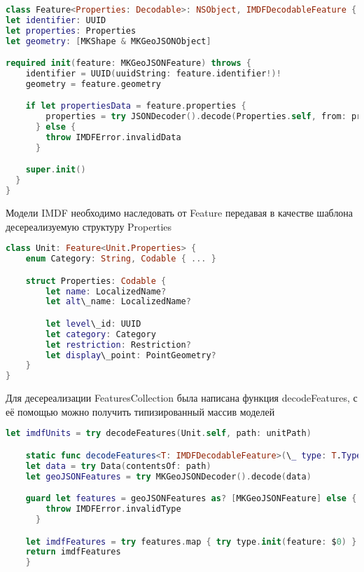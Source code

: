     \begin{lstlisting}[language=swift,caption={Реализация класса Feature}]
class Feature<Properties: Decodable>: NSObject, IMDFDecodableFeature {
let identifier: UUID
let properties: Properties
let geometry: [MKShape & MKGeoJSONObject]

required init(feature: MKGeoJSONFeature) throws {
    identifier = UUID(uuidString: feature.identifier!)!
    geometry = feature.geometry

    if let propertiesData = feature.properties {
        properties = try JSONDecoder().decode(Properties.self, from: propertiesData)
      } else {
        throw IMDFError.invalidData
      }

    super.init()
  }
}
  \end{lstlisting}

    Модели IMDF необходимо наследовать от Feature передавая в качестве шаблона десереализуемую структуру Properties

    \begin{lstlisting}[language=swift,caption={Пример объявления модели Unit}]
class Unit: Feature<Unit.Properties> {
    enum Category: String, Codable { ... }

    struct Properties: Codable {
        let name: LocalizedName?
        let alt\_name: LocalizedName?

        let level\_id: UUID
        let category: Category
        let restriction: Restriction?
        let display\_point: PointGeometry?
    }
}
    \end{lstlisting}

    Для десереализации FeaturesCollection была написана функция decodeFeatures, с её помощью можно получить типизированный массив моделей

    \begin{lstlisting}[language=swift,caption={Пример десереализации массива комнат Units}]
    let imdfUnits = try decodeFeatures(Unit.self, path: unitPath)

    static func decodeFeatures<T: IMDFDecodableFeature>(\_ type: T.Type, path: URL) throws -> [T] {
    let data = try Data(contentsOf: path)
    let geoJSONFeatures = try MKGeoJSONDecoder().decode(data)

    guard let features = geoJSONFeatures as? [MKGeoJSONFeature] else {
        throw IMDFError.invalidType
      }

    let imdfFeatures = try features.map { try type.init(feature: $0) }
    return imdfFeatures
    }
  \end{lstlisting}

